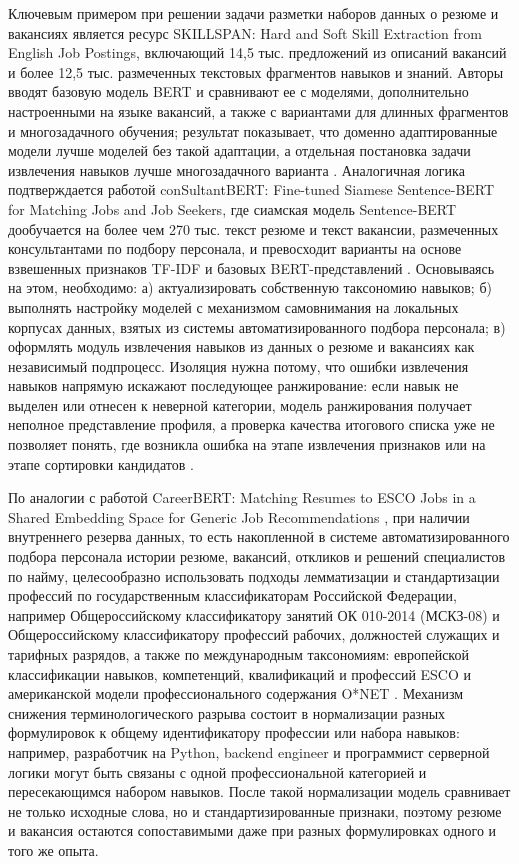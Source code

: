 Ключевым примером при решении задачи разметки наборов данных о резюме и вакансиях является ресурс SKILLSPAN: Hard and Soft Skill Extraction from English Job Postings, включающий 14,5 тыс. предложений из описаний вакансий и более 12,5 тыс. размеченных текстовых фрагментов навыков и знаний. Авторы вводят базовую модель BERT и сравнивают ее с моделями, дополнительно настроенными на языке вакансий, а также с вариантами для длинных фрагментов и многозадачного обучения; результат показывает, что доменно адаптированные модели лучше моделей без такой адаптации, а отдельная постановка задачи извлечения навыков лучше многозадачного варианта \cite{src24}. Аналогичная логика подтверждается работой conSultantBERT: Fine-tuned Siamese Sentence-BERT for Matching Jobs and Job Seekers, где сиамская модель Sentence-BERT дообучается на более чем 270 тыс. текст резюме и текст вакансии, размеченных консультантами по подбору персонала, и превосходит варианты на основе взвешенных признаков TF-IDF и базовых BERT-представлений \cite{src39}. Основываясь на этом, необходимо: а) актуализировать собственную таксономию навыков; б) выполнять настройку моделей с механизмом самовнимания на локальных корпусах данных, взятых из системы автоматизированного подбора персонала; в) оформлять модуль извлечения навыков из данных о резюме и вакансиях как независимый подпроцесс. Изоляция нужна потому, что ошибки извлечения навыков напрямую искажают последующее ранжирование: если навык не выделен или отнесен к неверной категории, модель ранжирования получает неполное представление профиля, а проверка качества итогового списка уже не позволяет понять, где возникла ошибка на этапе извлечения признаков или на этапе сортировки кандидатов \cite{src18, src24}.\par
По аналогии с работой CareerBERT: Matching Resumes to ESCO Jobs in a Shared Embedding Space for Generic Job Recommendations \cite{src01}, при наличии внутреннего резерва данных, то есть накопленной в системе автоматизированного подбора персонала истории резюме, вакансий, откликов и решений специалистов по найму, целесообразно использовать подходы лемматизации и стандартизации профессий по государственным классификаторам Российской Федерации, например Общероссийскому классификатору занятий ОК 010-2014 (МСКЗ-08) и Общероссийскому классификатору профессий рабочих, должностей служащих и тарифных разрядов, а также по международным таксономиям: европейской классификации навыков, компетенций, квалификаций и профессий ESCO и американской модели профессионального содержания O*NET \cite{src30, src31}. Механизм снижения терминологического разрыва состоит в нормализации разных формулировок к общему идентификатору профессии или набора навыков: например, разработчик на Python, backend engineer и программист серверной логики могут быть связаны с одной профессиональной категорией и пересекающимся набором навыков. После такой нормализации модель сравнивает не только исходные слова, но и стандартизированные признаки, поэтому резюме и вакансия остаются сопоставимыми даже при разных формулировках одного и того же опыта.\par

